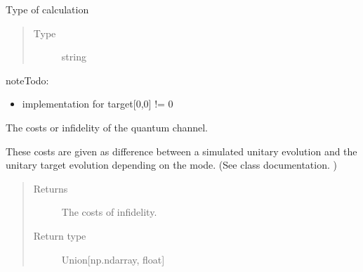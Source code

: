\documentclass[letterpaper,10pt,english]{sphinxmanual}
\begin{document}
\begin{fulllineitems}
\begin{quote}
\begin{description}
\begin{itemize}
\end{itemize}

\end{description}\end{quote}

\begin{fulllineitems}
\label{\detokenize{qsim:qsim.cost_functions.OperatorMatrixNorm.mode}}
Type of calculation
\begin{quote}\begin{description}
\item[{Type}] \leavevmode
string

\end{description}\end{quote}

\end{fulllineitems}


\begin{sphinxadmonition}{note}{\label{\detokenize{qsim:id7}}Todo:}\begin{itemize}
\item {} 
implementation for target{[}0,0{]} != 0

\end{itemize}
\end{sphinxadmonition}

\begin{fulllineitems}
\label{\detokenize{qsim:qsim.cost_functions.OperatorMatrixNorm.costs}}
The costs or infidelity of the quantum channel.

These costs are given as difference between a simulated unitary
evolution and the unitary target evolution depending on the mode.
(See class documentation. )
\begin{quote}\begin{description}
\item[{Returns}] \leavevmode
{} \textendash{} The costs of infidelity.

\item[{Return type}] \leavevmode
Union{[}np.ndarray, float{]}

\end{description}\end{quote}


\end{fulllineitems}
\end{fulllineitems}
\end{document}
